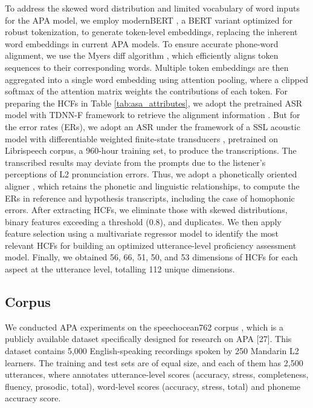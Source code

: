 \documentclass[conference,a4paper]{APSIPA2025}
\begin{document}
To address the skewed word distribution and limited vocabulary of word inputs for the APA model, we employ modernBERT \cite{warner2024smarterbetterfasterlonger}, a BERT variant optimized for robust tokenization, to generate token-level embeddings, replacing the inherent word embeddings in current APA models. To ensure accurate phone-word alignment, we use the Myers diff algorithm \cite{myers1986nd}, which efficiently aligns token sequences to their corresponding words. Multiple token embeddings are then aggregated into a single word embedding using attention pooling, where a clipped softmax of the attention matrix weights the contributions of each token.
For preparing the HCFs in Table \ref{tab:asa_attributes}, we adopt the pretrained ASR model with TDNN-F framework to retrieve the alignment information \cite{zhang21x_interspeech}. But for the error rates (ERs), we adopt an ASR under the framework of a SSL acoustic model with differentiable weighted finite-state transducers \cite{10832327}, pretrained on Librispeech \cite{7178964} corpus, a 960-hour training set, to produce the transcriptions. The transcribed results may deviate from the prompts due to the listener's perceptions of L2 pronunciation errors. Thus, we adopt a phonetically oriented aligner \cite{7404808}, which retains the phonetic and linguistic relationships, to compute the ERs in reference and hypothesis transcripts, including the case of homophonic errors. After extracting HCFs, we eliminate those with skewed distributions, binary features exceeding a threshold (0.8), and duplicates. We then apply feature selection using a multivariate regressor model \cite{tibshirani1996regression} to identify the most relevant HCFs for building an optimized utterance-level proficiency assessment model. Finally, we obtained 56, 66, 51, 50, and 53 dimensions of HCFs for each aspect at the utterance level, totalling 112 unique dimensions.


\subsection{Corpus}
\label{subsec:corpus}

We conducted APA experiments on the speechocean762 corpus \cite{zhang21x_interspeech}, which is a publicly available dataset specifically designed for research on APA [27]. This dataset contains 5,000 English-speaking recordings spoken by 250 Mandarin L2 learners. The training and test sets are of equal size, and each of them has 2,500 utterances, where annotates utterance-level scores (accuracy, stress, completeness, fluency, prosodic, total), word-level scores (accuracy, stress, total) and phoneme accuracy score.
\end{document}
